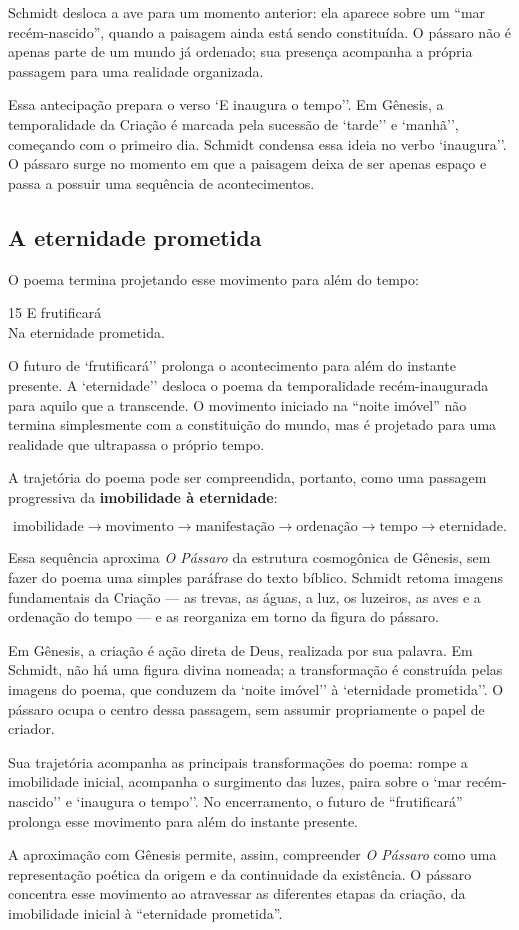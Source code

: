 Schmidt desloca a ave para um momento anterior: ela aparece sobre um ``mar
recém-nascido'', quando a paisagem ainda está sendo constituída. O pássaro não
é apenas parte de um mundo já ordenado; sua presença acompanha a própria
passagem para uma realidade organizada.

Essa antecipação prepara o verso `E inaugura o tempo''. Em Gênesis, a
temporalidade da Criação é marcada pela sucessão de `tarde'' e `manhã'',
começando com o primeiro dia. Schmidt condensa essa ideia no verbo
`inaugura''. O pássaro surge no momento em que a paisagem deixa de ser apenas
espaço e passa a possuir uma sequência de acontecimentos.

\subsection{A eternidade prometida}

O poema termina projetando esse movimento para além do tempo:

\begin{poemquote}[0.49\textwidth]{15}
E frutificará \\
Na eternidade prometida.
\end{poemquote}

O futuro de `frutificará'' prolonga o acontecimento para além do instante
presente. A `eternidade'' desloca o poema da temporalidade recém-inaugurada
para aquilo que a transcende. O movimento iniciado na ``noite imóvel'' não
termina simplesmente com a constituição do mundo, mas é projetado para uma
realidade que ultrapassa o próprio tempo.

A trajetória do poema pode ser compreendida, portanto, como uma passagem
progressiva da \textbf{imobilidade à eternidade}:

$$
\text{imobilidade}
\longrightarrow
\text{movimento}
\longrightarrow
\text{manifestação}
\longrightarrow
\text{ordenação}
\longrightarrow
\text{tempo}
\longrightarrow
\text{eternidade}.
$$

Essa sequência aproxima \textit{O Pássaro} da estrutura cosmogônica de Gênesis,
sem fazer do poema uma simples paráfrase do texto bíblico. Schmidt retoma
imagens fundamentais da Criação --- as trevas, as águas, a luz, os luzeiros, as
aves e a ordenação do tempo --- e as reorganiza em torno da figura do pássaro.

Em Gênesis, a criação é ação direta de Deus, realizada por sua palavra. Em
Schmidt, não há uma figura divina nomeada; a transformação é construída pelas
imagens do poema, que conduzem da `noite imóvel'' à `eternidade prometida''.
O pássaro ocupa o centro dessa passagem, sem assumir propriamente o papel de
criador.

Sua trajetória acompanha as principais transformações do poema: rompe a
imobilidade inicial, acompanha o surgimento das luzes, paira sobre o `mar
recém-nascido'' e `inaugura o tempo''. No encerramento, o futuro de
``frutificará'' prolonga esse movimento para além do instante presente.

A aproximação com Gênesis permite, assim, compreender \textit{O Pássaro} como
uma representação poética da origem e da continuidade da existência. O pássaro
concentra esse movimento ao atravessar as diferentes etapas da criação, da
imobilidade inicial à ``eternidade prometida''.

